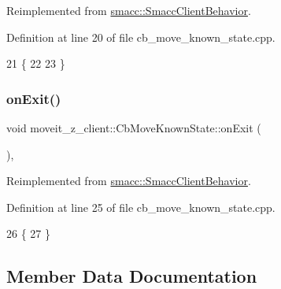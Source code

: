 Reimplemented from \hyperlink{classsmacc_1_1SmaccClientBehavior_a7962382f93987c720ad432fef55b123f}{smacc\+::\+Smacc\+Client\+Behavior}.



Definition at line 20 of file cb\+\_\+move\+\_\+known\+\_\+state.\+cpp.


\begin{DoxyCode}
21 \{
22     
23 \}
\end{DoxyCode}
\mbox{\label{classmoveit__z__client_1_1CbMoveKnownState_a336ec449b5ad07a37731f0a782b12a67}} 
\subsubsection{\texorpdfstring{on\+Exit()}{onExit()}}
{\footnotesize\ttfamily void moveit\+\_\+z\+\_\+client\+::\+Cb\+Move\+Known\+State\+::on\+Exit (\begin{DoxyParamCaption}{ }\end{DoxyParamCaption})\hspace{0.3cm}{\ttfamily [override]}, {\ttfamily [virtual]}}



Reimplemented from \hyperlink{classsmacc_1_1SmaccClientBehavior_ac0cd72d42bd00425362a97c9803ecce5}{smacc\+::\+Smacc\+Client\+Behavior}.



Definition at line 25 of file cb\+\_\+move\+\_\+known\+\_\+state.\+cpp.


\begin{DoxyCode}
26 \{
27 \}
\end{DoxyCode}


\subsection{Member Data Documentation}
\mbox{\label{classmoveit__z__client_1_1CbMoveKnownState_a474f1470f8714411a676b9341a95130e}} 
